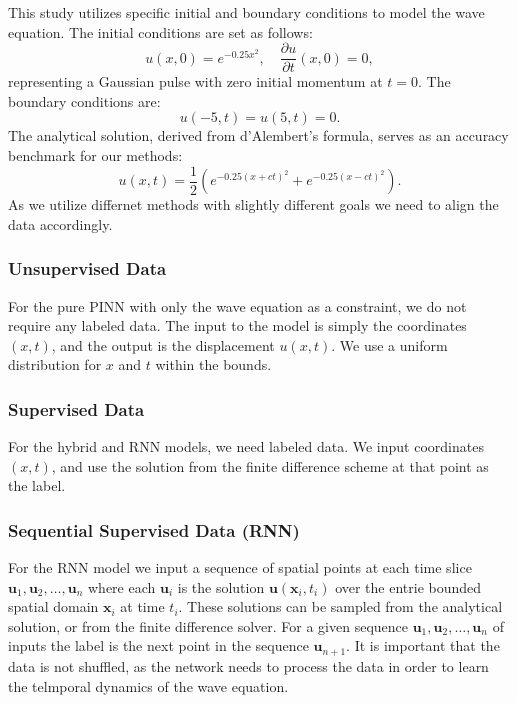 \documentclass[twoside,11pt]{report}
\begin{document}
    This study utilizes specific initial and boundary conditions to model the wave equation. 
    The initial conditions are set as follows:
    \begin{equation}
    u(x,0) = e^{-0.25x^2},
    \quad \frac{\partial u}{\partial t}(x,0) = 0,
    \end{equation}
    representing a Gaussian pulse with zero initial momentum at $t=0$. 
    The boundary conditions are:
    \begin{equation}
    u(-5,t) = u(5,t) = 0.
    \end{equation}
    The analytical solution, derived from d'Alembert’s formula, serves as an accuracy benchmark for our methods:
    \begin{equation}
    u(x,t) = \frac{1}{2}(e^{-0.25(x+ct)^2} + e^{-0.25(x-ct)^2}).
    \end{equation}
    As we utilize differnet methods with slightly different goals we need to align the data accordingly.
    \subsubsection{Unsupervised Data}
    For the pure PINN with only the wave equation as a constraint, we do not require any labeled data.
    The input to the model is simply the coordinates $(x,t)$, and the output is the displacement $u(x,t)$. 
    We use a uniform distribution for $x$ and $t$ within the bounds.
    \subsubsection{Supervised Data}
    For the hybrid and RNN models, we need labeled data. We input coordinates $(x,t)$,
    and use the solution from the finite difference scheme at that point as the label.
    \subsubsection{Sequential Supervised Data (RNN)}
    For the RNN model we input a sequence of spatial points at each time slice 
    $\mathbf{u}_1, \mathbf{u}_2, \dots, \mathbf{u}_n$ where each $\mathbf{u}_i$ is the 
    solution $\mathbf{u}(\mathbf{x}_i,t_i)$
    over the entrie bounded spatial domain $\mathbf{x}_i$ at time $t_i$. These solutions can be sampled from the analytical
    solution, or from the finite difference solver.
    For a given sequence $\mathbf{u}_1, \mathbf{u}_2, \dots, \mathbf{u}_n$ of inputs the 
    label is the next point in the sequence
    $\mathbf{u}_{n+1}$.
    It is important that the data is not shuffled, as the network needs to process the data in order to learn the
    telmporal dynamics of the wave equation.
    
\end{document}
